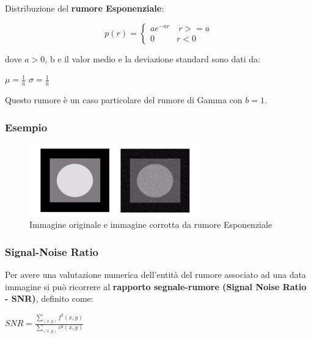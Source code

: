 Distribuzione del \textbf{rumore Esponenziale}:

\begin{center}
    $$
        p(r) = \left\{ \begin{array}{cl}
            ae^{-ar} & \ r >= a \\
            0        & r<0
        \end{array} \right.
    $$
\end{center}
dove $a > 0$, b e il valor medio e la deviazione standard sono dati da:


\begin{center}
    $\mu = \frac{1}{a}$ $\sigma = \frac{1}{a}$
\end{center}

Questo rumore è un caso particolare del rumore di Gamma con $b = 1$.

\subsubsection{Esempio}

\begin{figure}[H]
    \centering
    \includegraphics[width=\linewidth, keepaspectratio]{capitoli/immagini/imgs/esempio-esponenziale.png}
    \caption*{Immagine originale e immagine corrotta da rumore Esponenziale}
\end{figure}

\subsubsection{Signal-Noise Ratio}

Per avere una valutazione numerica dell'entità del rumore associato ad una data immagine si può ricorrere al \textbf{rapporto segnale-rumore
    (Signal Noise Ratio - SNR)}, definito come:

\begin{center}
    $
        SNR = \frac{\sum_{(x,y)}^{}f^2(x,y)}{\sum_{(x,y)}^{}v^2(x,y)}
    $
\end{center}

